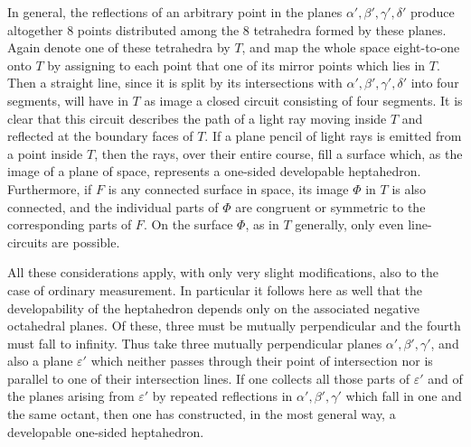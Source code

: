 \documentclass[11pt,a4paper]{article}
\begin{document}
In general, the reflections of an arbitrary point in the planes $\alpha',\beta',\gamma',\delta'$ produce altogether $8$ points distributed among the $8$ tetrahedra formed by these planes. Again denote one of these tetrahedra by $T$, and map the whole space eight-to-one onto $T$ by assigning to each point that one of its mirror points which lies in $T$. Then a straight line, since it is split by its intersections with $\alpha',\beta',\gamma',\delta'$ into four segments, will have in $T$ as image a closed circuit consisting of four segments. It is clear that this circuit describes the path of a light ray moving inside $T$ and reflected at the boundary faces of $T$. If a plane pencil of light rays is emitted from a point inside $T$, then the rays, over their entire course, fill a surface which, as the image of a plane of space, represents a one-sided developable heptahedron. Furthermore, if $F$ is any connected surface in space, its image $\Phi$ in $T$ is also connected, and the individual parts of $\Phi$ are congruent or symmetric to the corresponding parts of $F$. On the surface $\Phi$, as in $T$ generally, only even line-circuits are possible.

All these considerations apply, with only very slight modifications, also to the case of ordinary measurement. In particular it follows here as well that the developability of the heptahedron depends only on the associated negative octahedral planes. Of these, three must be mutually perpendicular and the fourth must fall to infinity. Thus take three mutually perpendicular planes $\alpha',\beta',\gamma'$, and also a plane $\varepsilon'$ which neither passes through their point of intersection nor is parallel to one of their intersection lines. If one collects all those parts of $\varepsilon'$ and of the planes arising from $\varepsilon'$ by repeated reflections in $\alpha',\beta',\gamma'$ which fall in one and the same octant, then one has constructed, in the most general way, a developable one-sided heptahedron.
\end{document}
